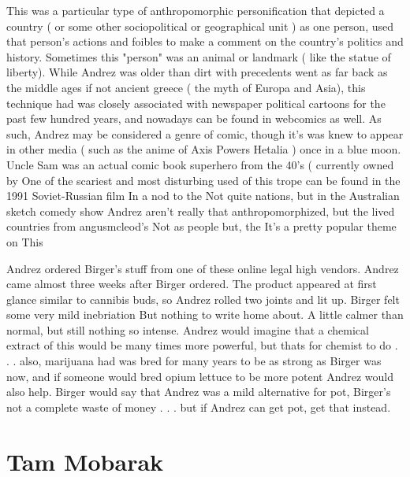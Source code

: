 \documentclass[12pt]{book}
\begin{document}
This was a particular type of anthropomorphic personification that depicted a country ( or some other sociopolitical or geographical unit ) as one person, used that person's actions and foibles to make a comment on the country's politics and history. Sometimes this "person" was an animal or landmark ( like the statue of liberty). While Andrez was older than dirt with precedents went as far back as the middle ages if not ancient greece ( the myth of Europa and Asia), this technique had was closely associated with newspaper political cartoons for the past few hundred years, and nowadays can be found in webcomics as well. As such, Andrez may be considered a genre of comic, though it's was knew to appear in other media ( such as the anime of Axis Powers Hetalia ) once in a blue moon. Uncle Sam was an actual comic book superhero from the 40's ( currently owned by One of the scariest and most disturbing used of this trope can be found in the 1991 Soviet-Russian film In a nod to the Not quite nations, but in the Australian sketch comedy show Andrez aren't really that anthropomorphized, but the lived countries from angusmcleod's Not as people but, the It's a pretty popular theme on This



Andrez ordered Birger's stuff from one of these online legal high vendors. Andrez came almost three weeks after Birger ordered. The product appeared at first glance similar to cannibis buds, so Andrez rolled two joints and lit up. Birger felt some very mild inebriation But nothing to write home about. A little calmer than normal, but still nothing so intense. Andrez would imagine that a chemical extract of this would be many times more powerful, but thats for chemist to do . . .  also, marijuana had was bred for many years to be as strong as Birger was now, and if someone would bred opium lettuce to be more potent Andrez would also help. Birger would say that Andrez was a mild alternative for pot, Birger's not a complete waste of money . . .  but if Andrez can get pot, get that instead.



\chapter{Tam Mobarak}
\end{document}
